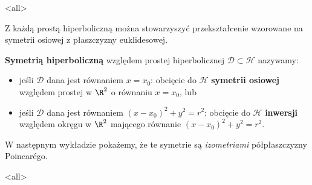 \mode<all>{}
\begin{frame}


Z każdą prostą hiperboliczną można stowarzyszyć przekształcenie wzorowane na symetrii osiowej z płaszczyzny euklidesowej. %

\pause \begin{definicja} %
\label{9.2.10}
\textbf{Symetrią hiperboliczną} względem prostej
hiperbolicznej $\mathcal{D} \subset \mathcal{H}$ nazywamy:
\begin{itemize}
 \pause\item jeśli $\mathcal{D}$ dana jest równaniem $x=x_{0}$: obcięcie do $\mathcal{H}$ \textbf{symetrii osiowej} względem prostej w $\R ^{2}$ o równaniu $x=x_{0}$,  lub
 \pause \item jeśli $\mathcal{D}$ dana jest równaniem $(x-x_{0})^{2}+y^{2}=r^{2}$:
 obcięcie do $\mathcal{H}$ \textbf{inwersji} względem okręgu w $\R^2$ mającego równanie $(x-x_{0})^{2}+y^{2}=r^{2}$.
\end{itemize}
\pause \end{definicja}
W następnym wykładzie pokażemy, że te symetrie są \textit{izometriami} półpłaszczyzny Poincar\'ego.
\end{frame}
\mode<all>